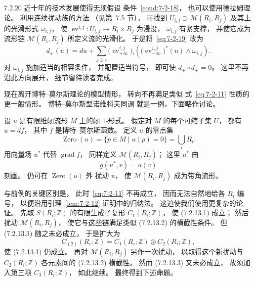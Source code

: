 \begin{remark}{7.2.20}\label{rem:7-2-20}
近十年的技术发展使得无须假设
条件~\ref{cond:7-2-18}，
也可以使用德拉姆理论。
利用连续扰动族的方法
（见第~7.5 节），
可找到
$U_{i,j}\supset\mathcal M(R_i,R_j)$
及其上的光滑形式 $\omega_{i,j}$，
使
$\operatorname{ev}^{i,j}\colon
U_{i,j}\to R_i\times R_j$
为浸没，
$\omega_{i,j}$ 有紧支撑，
并使它成为流形链
$\mathcal M(R_i,R_j)$
所定义流的光滑化。
于是将~\eqref{eq:7-2-19}
改为
\[
d_+(u)=du+
\sum_{j\ge i}
\bigl(\operatorname{ev}^{i,j}_{+\infty}\bigr)_!
\left(
\bigl(\operatorname{ev}^{i,j}_{-\infty}\bigr)^*(u)
\wedge\omega_{i,j}
\right).
\]
对 $\omega_{i,j}$
施加适当的相容条件，
并配置适当符号，
即可使 $d_+\circ d_+=0$。
这里不再沿此方向展开，
细节留待读者完成。
\end{remark}

现在离开博特--莫尔斯理论的模型情形，
转向不再满足类似
式~\eqref{eq:7-2-11}
性质的更一般情形。
博特--莫尔斯型诺维科夫同调
就是一例，下面略作讨论。

设 $u$ 是有限维闭流形 $M$
上的闭 $1$-形式。
假定对 $M$ 的每个可缩子集 $U$，
都有 $u=df$，
其中 $f$ 是博特--莫尔斯函数。
定义 $u$ 的零点集
\[
\operatorname{Zero}(u)
=\{p\in M\mid u(p)=0\}
=\bigcup_iR_i.
\]
用向量场 $u^*$ 代替
$\operatorname{grad}f$，
同样定义
$\mathcal M(R_i,R_j)$；
这里 $u^*$ 由
\[
g(u^*,v)=u(v)
\]
刻画。
仍可在 $\operatorname{Zero}(u)$ 外
扰动 $u$，
使 $\mathcal M(R_i,R_j)$
成为带角流形。

与前例的关键区别是，
此时~\eqref{eq:7-2-11}
不再成立，
因而无法自然地给各 $R_i$ 编号，
以便沿用引理~\ref{lem:7-2-12}
证明中的归纳法。
这迫使我们使用更复杂的论证。
先取 $S(R_i;\mathbb Z)$
的有限生成子复形
$C_1(R_i;\mathbb Z)$，
使 (7.2.13.1) 成立；
然后扰动 $\mathcal M(R_i,R_j)$，
使它与这些链满足类似
(7.2.13.2) 的横截性条件。
但 (7.2.13.3) 随之未必成立，
于是扩大为
\[
C_{(2)}(R_i;\mathbb Z)
=C_1(R_i;\mathbb Z)
\oplus C_2(R_i;\mathbb Z),
\]
使 (7.2.13.1) 仍成立。
再对 $\mathcal M(R_i,R_j)$
另作一次扰动，
以取得这个新扰动与
$C_2(R_i;\mathbb Z)$
各元素间的 (7.2.13.2) 横截性。
然而 (7.2.13.3) 又未必成立，
故须加入第三项
$C_3(R_i;\mathbb Z)$，
如此继续。
最终得到下述命题。

